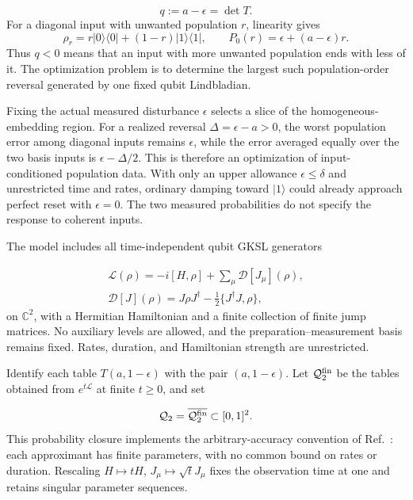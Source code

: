 \documentclass[aps,pra,reprint,amsmath,amssymb,nofootinbib,floatfix,longbibliography]{revtex4-2}
\theoremstyle{aps}
\newcommand{\Q}{\mathcal Q_2}
\newcommand{\Diss}{\mathcal D}
\newcommand{\eps}{\epsilon}
\newcommand{\ket}[1]{|#1\rangle}
\newcommand{\proj}[1]{|#1\rangle\langle#1|}
\begin{document}
\begin{equation}\label{eq:det}
 q:=a-\eps=\det T.
\end{equation}
For a diagonal input with unwanted population $r$, linearity gives
\begin{equation}\label{eq:population-order}
 \rho_r=r\proj0+(1-r)\proj1,\qquad
 P_0(r)=\eps+(a-\eps)r.
\end{equation}
Thus $q<0$ means that an input with more unwanted population ends with less of it. The optimization problem is to determine the largest such population-order reversal generated by one fixed qubit Lindbladian.

Fixing the actual measured disturbance $\eps$ selects a slice of the homogeneous-embedding region. For a realized reversal $\Delta=\eps-a>0$, the worst population error among diagonal inputs remains $\eps$, while the error averaged equally over the two basis inputs is $\eps-\Delta/2$. This is therefore an optimization of input-conditioned population data. With only an upper allowance $\eps\le\delta$ and unrestricted time and rates, ordinary damping toward $\ket1$ could already approach perfect reset with $\eps=0$. The two measured probabilities do not specify the response to coherent inputs.

The model includes all time-independent qubit GKSL generators \cite{GKS1976,Lindblad1976}

\begin{equation}\label{eq:gksl}
 \begin{gathered}
 \mathcal L(\rho)=-i[H,\rho]+\sum_\mu\Diss[J_\mu](\rho),\\
 \Diss[J](\rho)=J\rho J^\dagger-\tfrac12\{J^\dagger J,\rho\},
 \end{gathered}
\end{equation}
on $\mathbb C^2$, with a Hermitian Hamiltonian and a finite collection of finite jump matrices. No auxiliary levels are allowed, and the preparation--measurement basis remains fixed. Rates, duration, and Hamiltonian strength are unrestricted.

Identify each table $T(a,1-\eps)$ with the pair $(a,1-\eps)$. Let $\mathcal Q_2^{\rm fin}$ be the tables obtained from $e^{t\mathcal L}$ at finite $t\ge0$, and set

\begin{equation}\label{eq:closure}
 \Q=\overline{\mathcal Q_2^{\rm fin}}\subset[0,1]^2.
\end{equation}
This probability closure implements the arbitrary-accuracy convention of Ref.~\cite{Shahbeigi2024}: each approximant has finite parameters, with no common bound on rates or duration. Rescaling $H\mapsto tH$, $J_\mu\mapsto\sqrt tJ_\mu$ fixes the observation time at one and retains singular parameter sequences.
\end{document}
